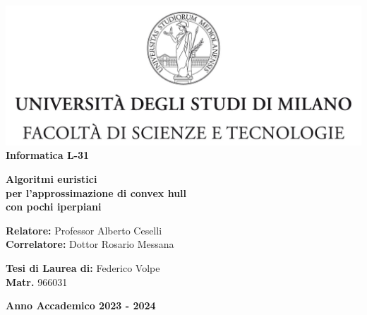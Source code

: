 \begin{titlepage}
\begin{center}
\includegraphics[width=\textwidth]{Logo.jpg}\\
{\large{\bf Informatica L-31}}
\end{center}
\vspace{12mm}
\begin{center}
{\huge{\bf Algoritmi euristici}}\\
\vspace{4mm}
{\huge{\bf per l'approssimazione di convex hull}}\\
\vspace{4mm}
{\huge{\bf con pochi iperpiani}}\\
\end{center}
\vspace{12mm}
\begin{flushleft}
{\large{\bf Relatore: }}
{\large{Professor Alberto Ceselli}}\\
{\large{\bf Correlatore: }}
{\large{Dottor Rosario Messana}}\\
\vspace{4mm}
\end{flushleft}
\vspace{12mm}
\begin{flushright}
{\large{\bf Tesi di Laurea di:}}
{\large{Federico Volpe}}\\
{\large{\bf Matr.}}
{\large{966031}}\\
\end{flushright}
\vspace{4mm}
\begin{center}
{\large{\bf Anno Accademico 2023 - 2024}}
\end{center}
\end{titlepage}
